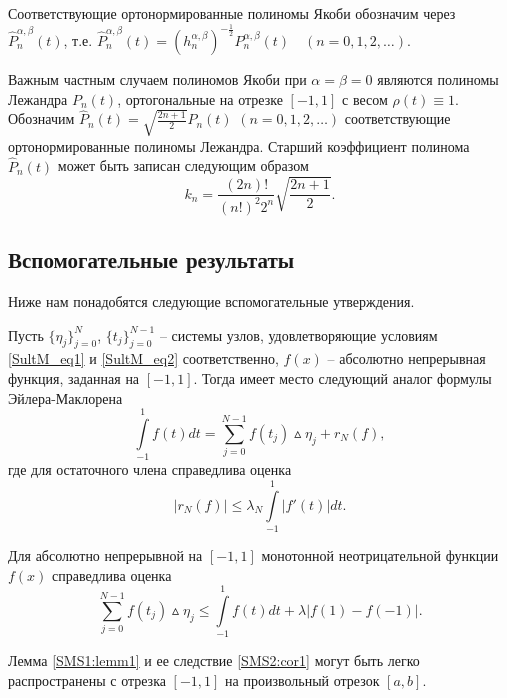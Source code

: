 Соответствующие ортонормированные полиномы Якоби обозначим через $\hat{P}_{n}^{\alpha,\beta}(t)$, т.е.
$\hat{P}_{n}^{\alpha,\beta}(t) = (h_n^{\alpha,\beta})^{-\frac12} P_{n}^{\alpha,\beta}(t) \quad (n=0,1,2,\dots)$.

Важным частным случаем полиномов Якоби при $\alpha = \beta = 0$ являются полиномы Лежандра $P_{n}(t)$, ортогональные на отрезке $[-1, 1]$ с весом $\rho(t)\equiv 1$.
Обозначим $\hat{P}_{n}(t)= \sqrt{\frac{2n+1}{2}} P_{n}(t)$ $(n = 0, 1,2, \ldots)$ соответствующие ортонормированные полиномы Лежандра. Старший коэффициент полинома $\hat{P}_{n}(t)$ может быть записан следующим образом
\begin{equation}
\label{maincoeff}
k_n = \frac{(2n)!}{(n!)^2 2^n} \sqrt{\frac{2n+1}{2}}.
\end{equation}

\subsection{Вспомогательные результаты}

Ниже нам понадобятся следующие вспомогательные утверждения.

\begin{lemma}
\label{SMS1:lemm1}
    Пусть $\{ \eta_j \}_{j=0}^N$, $\{ t_j \}_{j=0}^{N-1}$ -- системы узлов, удовлетворяющие условиям \eqref{SultM_eq1} и \eqref{SultM_eq2} соответственно, $f(x)$ -- абсолютно непрерывная функция, заданная на $[ -1, 1 ]$.
    Тогда имеет место следующий аналог формулы Эйлера-Маклорена
    \begin{equation*}
    \int\limits_{-1}^{1} f(t)dt = \sum_{j=0}^{N-1} f(t_j)\vartriangle\eta_j + r_N(f),
    \end{equation*}
    где для остаточного члена справедлива оценка
    \begin{equation*}
    |r_N(f)| \leq \lambda_N \int\limits_{-1}^{1} |f'(t)|dt.
    \end{equation*}
\end{lemma}


\begin{corollary}
\label{SMS2:cor1}
Для абсолютно непрерывной на $[ -1, 1 ]$ монотонной неотрицательной функции $f(x)$ справедлива оценка
\begin{equation*}
\sum_{j=0}^{N-1} f(t_j)\vartriangle\eta_j \leq \int\limits_{-1}^{1} f(t)dt + \lambda |f(1) - f(-1)|.
\end{equation*}
\end{corollary}


\begin{remark}
\label{SMS2:remrk1} Лемма \ref{SMS1:lemm1} и ее следствие \ref{SMS2:cor1} могут быть легко распространены с отрезка $[-1,1]$ на произвольный отрезок $[a,b]$.
\end{remark}


